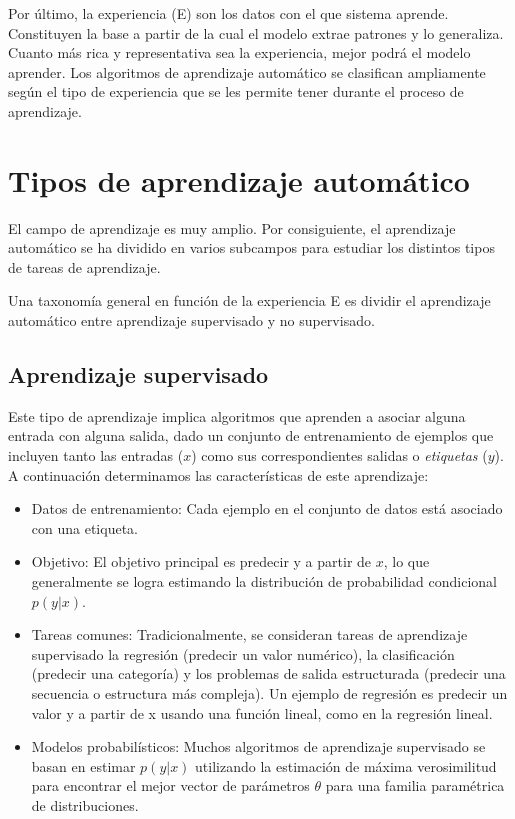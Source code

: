Por último, la experiencia (E) son los datos con el que sistema aprende. Constituyen la base a partir de la cual el modelo extrae patrones y lo generaliza. Cuanto más rica y representativa sea la experiencia, mejor podrá el modelo aprender. Los algoritmos de aprendizaje automático se clasifican ampliamente según el tipo de experiencia que se les permite tener durante el proceso de aprendizaje. 



\section{Tipos de aprendizaje automático}
El campo de aprendizaje es muy amplio. Por consiguiente, el aprendizaje automático se ha dividido en varios subcampos para estudiar los distintos tipos de tareas de aprendizaje. 

Una taxonomía general en función de la experiencia E es dividir el aprendizaje automático entre aprendizaje supervisado y no supervisado. 

\subsection{Aprendizaje supervisado}
Este tipo de aprendizaje implica algoritmos que aprenden a asociar alguna entrada con alguna salida, dado un conjunto de entrenamiento de ejemplos que incluyen tanto las entradas ($x$) como sus correspondientes salidas o \textit{etiquetas} ($y$). A continuación determinamos las características de este aprendizaje:

\begin{itemize}
    \item Datos de entrenamiento: Cada ejemplo en el conjunto de datos está asociado con una etiqueta. 
    \item Objetivo: El objetivo principal es predecir y a partir de $x$, lo que generalmente se logra estimando la distribución de probabilidad condicional $p(y|x)$.
    \item Tareas comunes: Tradicionalmente, se consideran tareas de aprendizaje supervisado la regresión (predecir un valor numérico), la clasificación (predecir una categoría) y los problemas de salida estructurada (predecir una secuencia o estructura más compleja). Un ejemplo de regresión es predecir un valor y a partir de x usando una función lineal, como en la regresión lineal.
    \item Modelos probabilísticos: Muchos algoritmos de aprendizaje supervisado se basan en estimar $p(y|x)$ utilizando la estimación de máxima verosimilitud para encontrar el mejor vector de parámetros $\theta$ para una familia paramétrica de distribuciones.
\end{itemize}


